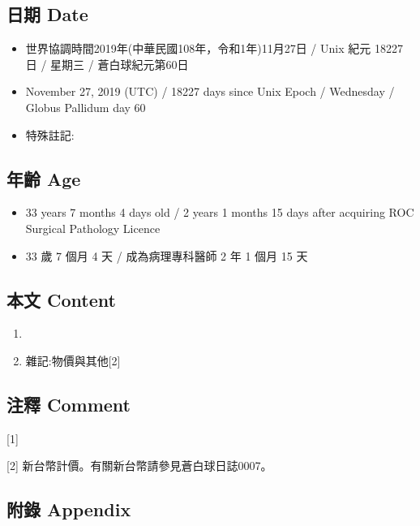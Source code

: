 \documentclass[a5paper, 12pt
]{book}
\providecommand{\tightlist}{%
  \setlength{\itemsep}{0pt}\setlength{\parskip}{0pt}}
\begin{document}
\hypertarget{ux65e5ux671f-date-59}{%
\subsection{日期 Date}\label{ux65e5ux671f-date-59}}

\begin{itemize}
\tightlist
\item
  世界協調時間2019年(中華民國108年，令和1年)11月27日 / Unix 紀元 18227
  日 / 星期三 / 蒼白球紀元第60日
\item
  November 27, 2019 (UTC) / 18227 days since Unix Epoch / Wednesday /
  Globus Pallidum day 60
\item
  特殊註記:
\end{itemize}

\hypertarget{ux5e74ux9f61-age-59}{%
\subsection{年齡 Age}\label{ux5e74ux9f61-age-59}}

\begin{itemize}
\tightlist
\item
  33 years 7 months 4 days old / 2 years 1 months 15 days after
  acquiring ROC Surgical Pathology Licence
\item
  33 歲 7 個月 4 天 / 成為病理專科醫師 2 年 1 個月 15 天
\end{itemize}

\hypertarget{ux672cux6587-content-59}{%
\subsection{本文 Content}\label{ux672cux6587-content-59}}

\begin{enumerate}
\def\labelenumi{\arabic{enumi}.}
\item
\item
  雜記:物價與其他{[}2{]}
\end{enumerate}

\hypertarget{ux6ce8ux91cb-comment-53}{%
\subsection{注釋 Comment}\label{ux6ce8ux91cb-comment-53}}

{[}1{]}

{[}2{]} 新台幣計價。有關新台幣請參見蒼白球日誌0007。

\hypertarget{ux9644ux9304-appendix-52}{%
\subsection{附錄 Appendix}\label{ux9644ux9304-appendix-52}}
\end{document}
